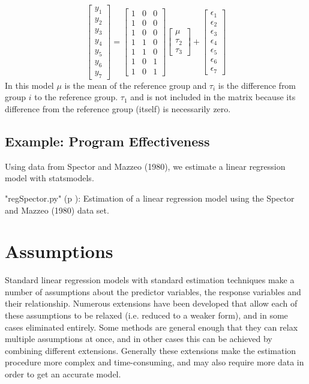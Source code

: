 \begin{equation}
  \begin{bmatrix}y_1 \\ y_2 \\ y_3 \\ y_4 \\ y_5 \\ y_6 \\ y_7 \end{bmatrix} =
  \begin{bmatrix}1 &0 &0 \\1 &0  &0 \\ 1 & 0 & 0 \\ 1 & 1 & 0 \\ 1 & 1 & 0 \\ 1 & 0 & 1 \\ 1  & 0 & 1\end{bmatrix}
  \begin{bmatrix}\mu \\  \tau_2 \\ \tau_3 \end{bmatrix}
  +
  \begin{bmatrix} \epsilon_1 \\ \epsilon_2 \\ \epsilon_3 \\ \epsilon_4 \\ \epsilon_5 \\ \epsilon_6 \\ \epsilon_7 \end{bmatrix}
\end{equation}
In this model $\mu$ is the mean of the reference group and $\tau_i$ is the difference from group $i$ to the reference group. $\tau_1$ and is not included in the matrix because its difference from the reference group (itself) is necessarily zero.
\subsection{Example: Program Effectiveness}

Using data from Spector and Mazzeo (1980), we estimate a linear regression model with statsmodels.

\PyImg "regSpector.py" (p \pageref{py:regSpector}): Estimation of a linear regression model using the Spector and Mazzeo (1980) data set.

\section{Assumptions}
Standard linear regression models with standard estimation techniques make a number of assumptions about the predictor variables, the response variables and their relationship.  Numerous extensions have been developed that allow each of these assumptions to be relaxed (i.e. reduced to a weaker form), and in some cases eliminated entirely.  Some methods are general enough that they can relax multiple assumptions at once, and in other cases this can be achieved by combining different extensions.  Generally these extensions make the estimation procedure more complex and time-consuming, and may also require more data in order to get an accurate model.

